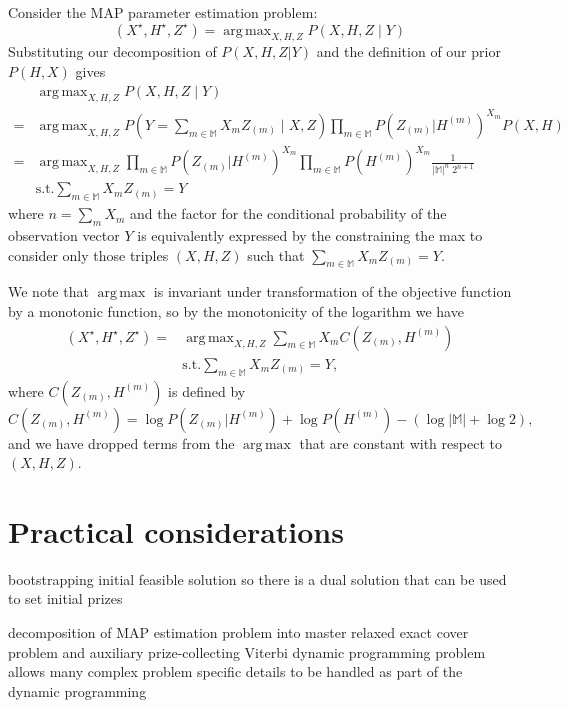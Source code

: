 \documentclass[twoside, 11pt]{article}
\newcommand{\mm}[0] {\mathbb{M}} %
\newcommand{\traj}[1] {H^{(#1)}}
\newcommand{\eventseq}[1] {Z_{(#1)}}
\DeclareMathOperator*{\argmax}{arg\,max}
\begin{document}
Consider the MAP parameter estimation problem:
\begin{equation}
(X^{\star}, H^{\star}, Z^{\star}) = \argmax_{X, H, Z} P\left(X, H, Z \mid Y\right)
\end{equation}
Substituting our decomposition of $P(X, H, Z | Y)$ and the definition of our prior $P(H, X)$ gives
\begin{align*}
& \argmax_{X, H, Z} P\left(X, H, Z \mid Y\right) \\
= & \argmax_{X, H, Z} P(Y = \sum_{m \in \mm} X_m \eventseq m \mid X, Z ) \prod_{m \in \mm} P\left(\eventseq m | \traj m\right)^{X_m} P(X, H) \\
= & \argmax_{X, H, Z} \prod_{m \in \mm} P\left(\eventseq m | \traj m\right)^{X_m}
\prod_{m \in \mm} P(\traj m)^{X_m}
\frac{1}{|\mm|^n \; 2^{n+1}} \\
 & \mathrm{s.t.} \sum_{m \in \mm} X_m \eventseq m = Y
\end{align*}
where $n = \sum_m X_m$ and the factor for the conditional probability of the observation vector $Y$ is equivalently expressed by the constraining the max to consider only those triples $(X, H, Z)$ such that $\sum_{m \in \mm} X_m \eventseq m = Y$.

We note that $\argmax$ is invariant under transformation of the objective function by a monotonic function, so by the monotonicity of the logarithm we have
\begin{align}
(X^{\star}, H^{\star}, Z^{\star})
= & \argmax_{X, H, Z} \sum_{m \in \mm} X_m C(\eventseq m, \traj m) \\
 & \mathrm{s.t.} \sum_{m \in \mm} X_m \eventseq m = Y ,
\end{align}
where $C(\eventseq m, \traj m)$ is defined by
\begin{equation*}
C(\eventseq m, \traj m) =
\log P\left(\eventseq m | \traj m\right) + 
\log P(\traj m) -
\left ( \log |\mm| + \log 2 \right) ,
\end{equation*}
and we have dropped terms from the $\argmax$ that are constant
with respect to $(X, H, Z)$.

\section{Practical considerations}

{bootstrapping initial feasible solution so there is a dual solution that can be used to set initial prizes}

{decomposition of MAP estimation problem into master relaxed exact cover problem and auxiliary prize-collecting Viterbi dynamic programming problem allows many complex problem specific details to be handled as part of the dynamic programming}
\end{document}

